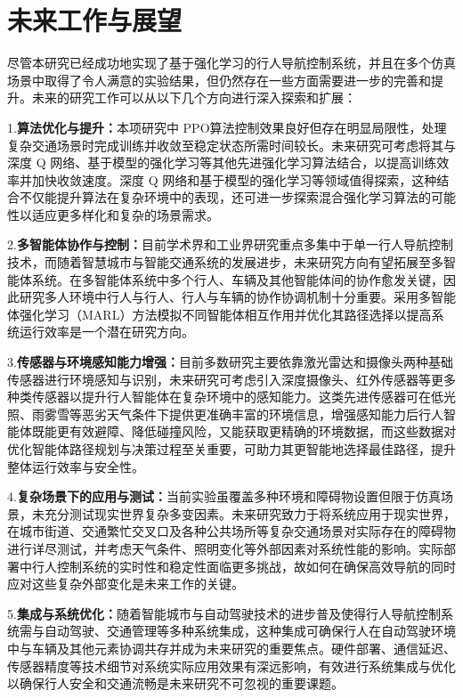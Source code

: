 \section{未来工作与展望}

尽管本研究已经成功地实现了基于强化学习的行人导航控制系统，并且在多个仿真场景中取得了令人满意的实验结果，但仍然存在一些方面需要进一步的完善和提升。未来的研究工作可以从以下几个方向进行深入探索和扩展：

1.\textbf{算法优化与提升：}本项研究中 PPO算法控制效果良好但存在明显局限性，处理复杂交通场景时完成训练并收敛至稳定状态所需时间较长。未来研究可考虑将其与深度 Q 网络、基于模型的强化学习等其他先进强化学习算法结合，以提高训练效率并加快收敛速度。深度 Q 网络和基于模型的强化学习等领域值得探索，这种结合不仅能提升算法在复杂环境中的表现，还可进一步探索混合强化学习算法的可能性以适应更多样化和复杂的场景需求。

2.\textbf{多智能体协作与控制：}目前学术界和工业界研究重点多集中于单一行人导航控制技术，而随着智慧城市与智能交通系统的发展进步，未来研究方向有望拓展至多智能体系统。在多智能体系统中多个行人、车辆及其他智能体间的协作愈发关键，因此研究多人环境中行人与行人、行人与车辆的协作协调机制十分重要。采用多智能体强化学习（MARL）方法模拟不同智能体相互作用并优化其路径选择以提高系统运行效率是一个潜在研究方向。

3.\textbf{传感器与环境感知能力增强：}目前多数研究主要依靠激光雷达和摄像头两种基础传感器进行环境感知与识别，未来研究可考虑引入深度摄像头、红外传感器等更多种类传感器以提升行人智能体在复杂环境中的感知能力。这类先进传感器可在低光照、雨雾雪等恶劣天气条件下提供更准确丰富的环境信息，增强感知能力后行人智能体既能更有效避障、降低碰撞风险，又能获取更精确的环境数据，而这些数据对优化智能体路径规划与决策过程至关重要，可助力其更智能地选择最佳路径，提升整体运行效率与安全性。

4.\textbf{复杂场景下的应用与测试：}当前实验虽覆盖多种环境和障碍物设置但限于仿真场景，未充分测试现实世界复杂多变因素。未来研究致力于将系统应用于现实世界，在城市街道、交通繁忙交叉口及各种公共场所等复杂交通场景对实际存在的障碍物进行详尽测试，并考虑天气条件、照明变化等外部因素对系统性能的影响。实际部署中行人控制系统的实时性和稳定性面临更多挑战，故如何在确保高效导航的同时应对这些复杂外部变化是未来工作的关键。

5.\textbf{集成与系统优化：}随着智能城市与自动驾驶技术的进步普及使得行人导航控制系统需与自动驾驶、交通管理等多种系统集成，这种集成可确保行人在自动驾驶环境中与车辆及其他元素协调共存并成为未来研究的重要焦点。硬件部署、通信延迟、传感器精度等技术细节对系统实际应用效果有深远影响，有效进行系统集成与优化以确保行人安全和交通流畅是未来研究不可忽视的重要课题。

